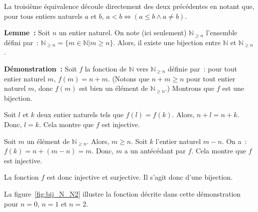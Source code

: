     La troisième équivalence découle directement des deux précédentes en notant que, pour tous entiers naturels $a$ et $b$, $a < b \Leftrightarrow (a \leq b \wedge a \neq b)$. 
    
    \done 

\medskip

\noindent\textbf{Lemme :} Soit $n$ un entier naturel. 
    On note (ici seulement) $\mathbb{N}_{\geq n}$ l'ensemble défini par : $\mathbb{N}_{\geq n} = \lbrace m \in \mathbb{N} \vert m \geq n \rbrace$.
    Alors, il existe une bijection entre $\mathbb{N}$ et $\mathbb{N}_{\geq n}$.

\medskip

\noindent\textbf{Démonstration :}
    Soit $f$ la fonction de $\mathbb{N}$ vers $\mathbb{N}_{\geq n}$ définie par : pour tout entier naturel $m$, $f(m) = n + m$.
    (Notons que $n+m \geq n$ pour tout entier naturel $m$, donc $f(m)$ est bien un élément de $\mathbb{N}_{\geq n}$.)
    Montrons que $f$ est une bijection.
    
    Soit $l$ et $k$ deux entier naturels tels que $f(l) = f(k)$.
    Alors, $n + l = n + k$.
    Donc, $l = k$.
    Cela montre que $f$ est injective.

    Soit $m$ un élément de $\mathbb{N}_{\geq n}$. 
    Alors, $m \geq n$.
    Soit $k$ l'entier naturel $m - n$.
    On a : $f(k) = n + (m - n) = m$.
    Donc, $m$ a un antécédant par $f$. 
    Cela montre que $f$ est injective. 

    La fonction $f$ est donc injective et surjective. 
    Il s'agit donc d'une bijection.

    \done

\medskip

La figure~\ref{fig:bij_N_N2} illustre la fonction décrite dans cette démonstration pour $n = 0$, $n = 1$ et $n = 2$.

